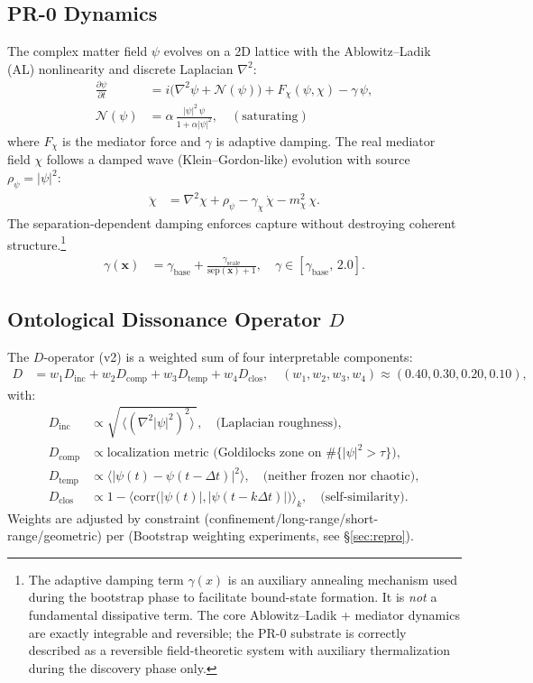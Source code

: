\documentclass[12pt]{article}
\begin{document}
\subsection{PR-0 Dynamics}
The complex matter field $\psi$ evolves on a 2D lattice with the Ablowitz--Ladik (AL) nonlinearity and discrete Laplacian $\nabla^2$:
\begin{align}
\frac{\partial \psi}{\partial t} &= i\big(\nabla^2 \psi + \mathcal{N}(\psi)\big) + F_{\chi}(\psi,\chi) - \gamma\,\psi,\\
\mathcal{N}(\psi) &= \alpha\,\frac{|\psi|^2\,\psi}{1 + \alpha |\psi|^2},\quad (\text{saturating})
\end{align}
where $F_{\chi}$ is the mediator force and $\gamma$ is adaptive damping. The real mediator field $\chi$ follows a damped wave (Klein--Gordon-like) evolution with source $\rho_{\psi}=|\psi|^2$:
\begin{align}
\ddot{\chi} &= \nabla^2 \chi + \rho_{\psi} - \gamma_{\chi}\,\dot{\chi} - m_{\chi}^2\,\chi.
\end{align}
The separation-dependent damping enforces capture without destroying coherent structure.\footnote{The adaptive damping term $\gamma(x)$ is an auxiliary annealing mechanism used during the bootstrap phase to facilitate bound-state formation. It is \emph{not} a fundamental dissipative term. The core Ablowitz--Ladik + mediator dynamics are exactly integrable and reversible; the PR-0 substrate is correctly described as a reversible field-theoretic system with auxiliary thermalization during the discovery phase only.}
\begin{align}
\gamma(\mathbf{x}) &= \gamma_{\mathrm{base}} + \frac{\gamma_{\mathrm{scale}}}{\mathrm{sep}(\mathbf{x}) + 1},\quad \gamma \in [\gamma_{\mathrm{base}},\,2.0].
\end{align}

\subsection{Ontological Dissonance Operator $D$}
The $D$-operator (v2) is a weighted sum of four interpretable components:
\begin{align}
D &= w_1 D_{\mathrm{inc}} + w_2 D_{\mathrm{comp}} + w_3 D_{\mathrm{temp}} + w_4 D_{\mathrm{clos}},\quad (w_1,w_2,w_3,w_4)\approx (0.40,0.30,0.20,0.10),\label{eq:Dsum}
\end{align}
with:
\begin{align}
D_{\mathrm{inc}} &\propto \sqrt{\,\langle (\nabla^2 |\psi|^2)^2\rangle\,},\quad \text{(Laplacian roughness)},\\
D_{\mathrm{comp}} &\propto \text{localization metric (Goldilocks zone on }\#\{ |\psi|^2>\tau\}),\\
D_{\mathrm{temp}} &\propto \langle |\psi(t)-\psi(t-\Delta t)|^2\rangle,\quad \text{(neither frozen nor chaotic)},\\
D_{\mathrm{clos}} &\propto 1 - \langle \mathrm{corr}\big(|\psi(t)|,|\psi(t-k\Delta t)|\big)\rangle_{k},\quad \text{(self-similarity)}.
\end{align}
Weights are adjusted by constraint (confinement/long-range/short-range/geometric) per (Bootstrap weighting experiments, see \S\ref{sec:repro}).
\end{document}
